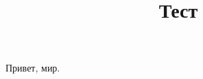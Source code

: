 \documentclass[
]{article}
\title{Тест}
\author{}
\date{}
\begin{document}
\maketitle

Привет, мир.
\end{document}
